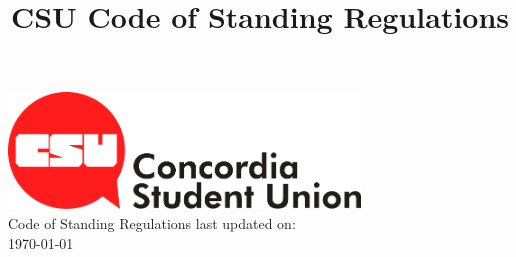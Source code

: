 \documentclass[oneside]{book}
\title{CSU Code of Standing Regulations}
\begin{document}
\begin{titlepage}

\begin{center}

\includegraphics[width=0.7\textwidth]{./csulogo} \\
\vfill
{\Huge Code of Standing Regulations}
\vfill
{\LARGE last updated on: \\ \today}
\end{center}

\end{titlepage}

\tableofcontents{}


\pagebreak{}
\setcounter{secnumdepth}{-2}
\end{document}
